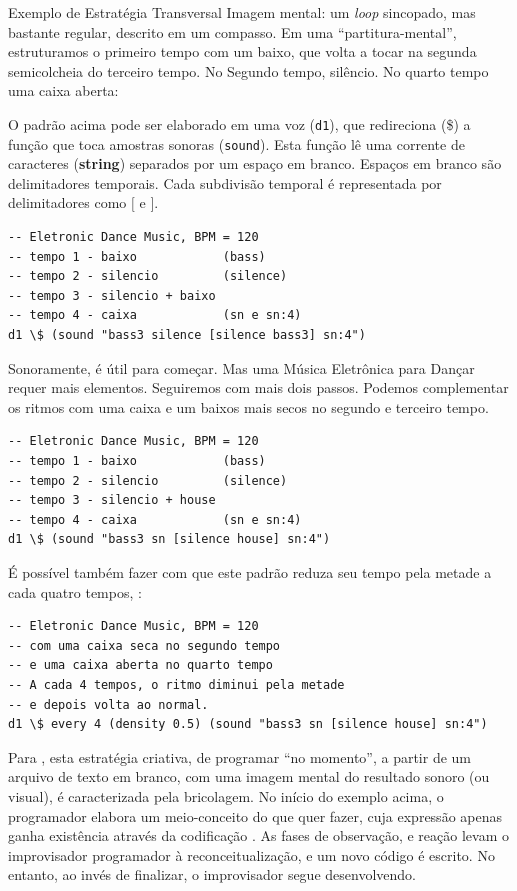 {\begin{example}{Exemplo de Estratégia Transversal}
Imagem mental: um \emph{loop} sincopado, mas bastante regular, descrito em um compasso. Em uma ``partitura-mental'', estruturamos o primeiro tempo com um baixo, que volta a tocar na segunda semicolcheia do terceiro tempo. No Segundo tempo, silêncio. No quarto tempo uma caixa aberta:



O padrão acima pode ser elaborado em uma voz (\verb|d1|), que redireciona (\$) a função que toca amostras sonoras (\verb|sound|). Esta função lê uma corrente de caracteres (\textbf{string}) separados por um espaço em branco. Espaços em branco são delimitadores temporais. Cada subdivisão temporal é representada por delimitadores como $[$ e $]$. 

\begin{verbatim}
-- Eletronic Dance Music, BPM = 120 
-- tempo 1 - baixo            (bass)
-- tempo 2 - silencio         (silence)
-- tempo 3 - silencio + baixo
-- tempo 4 - caixa            (sn e sn:4)
d1 \$ (sound "bass3 silence [silence bass3] sn:4")
\end{verbatim}

Sonoramente, é útil para começar. Mas uma Música Eletrônica para Dançar requer mais elementos. Seguiremos com mais dois passos. Podemos complementar os ritmos com uma caixa e um baixos mais secos no segundo e terceiro tempo.



\begin{verbatim}
-- Eletronic Dance Music, BPM = 120 
-- tempo 1 - baixo            (bass)
-- tempo 2 - silencio         (silence)
-- tempo 3 - silencio + house
-- tempo 4 - caixa            (sn e sn:4)
d1 \$ (sound "bass3 sn [silence house] sn:4")
\end{verbatim}

É possível também fazer com que este padrão reduza seu tempo pela metade a cada quatro tempos, :



\begin{verbatim}
-- Eletronic Dance Music, BPM = 120
-- com uma caixa seca no segundo tempo
-- e uma caixa aberta no quarto tempo
-- A cada 4 tempos, o ritmo diminui pela metade 
-- e depois volta ao normal.
d1 \$ every 4 (density 0.5) (sound "bass3 sn [silence house] sn:4")
\end{verbatim}
\end{example}

Para , esta estratégia criativa, de programar ``no momento'', a partir de um arquivo de texto em branco, com uma imagem mental do resultado sonoro (ou visual), é caracterizada pela  bricolagem. No início do exemplo acima, o programador elabora um meio-conceito do que quer fazer, cuja expressão apenas ganha existência através da codificação . As fases de observação, e reação levam o improvisador programador à reconceitualização, e um novo código é escrito. No entanto, ao invés de finalizar, o improvisador segue desenvolvendo.

}
